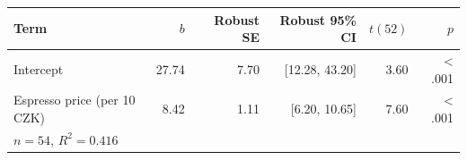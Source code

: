 \begin{tabular}{lrrrrr}
\toprule
Term & $b$ & Robust SE & Robust 95\% CI & $t(52)$ & $p$ \\
\midrule
Intercept & 27.74 & 7.70 & [12.28, 43.20] & 3.60 & < .001 \\
Espresso price (per 10 CZK) & 8.42 & 1.11 & [6.20, 10.65] & 7.60 & < .001 \\
\midrule
\multicolumn{6}{l}{$n = 54$, $R^2 = 0.416$} \\
\bottomrule
\end{tabular}

